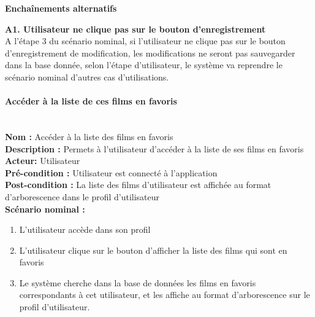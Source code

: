 \documentclass[12pt]{article}
\begin{document}
\textbf{Enchaînements alternatifs}
\begin{description}
    \item \textbf{A1. Utilisateur ne clique pas sur le bouton d'enregistrement}\\
    A l'étape 3 du scénario nominal, si l'utilisateur ne clique pas sur le bouton d'enregistrement de modification, les modifications ne seront pas sauvegarder dans la base donnée, selon l'étape d'utilisateur, le système va reprendre le scénario nominal d'autres cas d'utilisations.
\end{description}

\paragraph{Accéder à la liste de ces films en favoris}
\leavevmode \\
\textbf{Nom :} Accéder à la liste des films en favoris\\
\textbf{Description :} Permets à l'utilisateur d'accéder à la liste de ses films en favoris \\
\textbf{Acteur: } Utilisateur\\
\textbf{Pré-condition : } Utilisateur est connecté à l'application\\
\textbf{Post-condition : } La liste des films d'utilisateur est affichée au format d'arborescence dans le profil d'utilisateur\\
\textbf{Scénario nominal : }
\begin{enumerate}
    \item L'utilisateur accède dans son profil
    \item L'utilisateur clique sur le bouton d'afficher la liste des films qui sont en favoris
    \item Le système cherche dans la base de données les films en favoris correspondants à cet utilisateur, et les affiche au format d'arborescence sur le profil d'utilisateur.
\end{enumerate}
\end{document}
